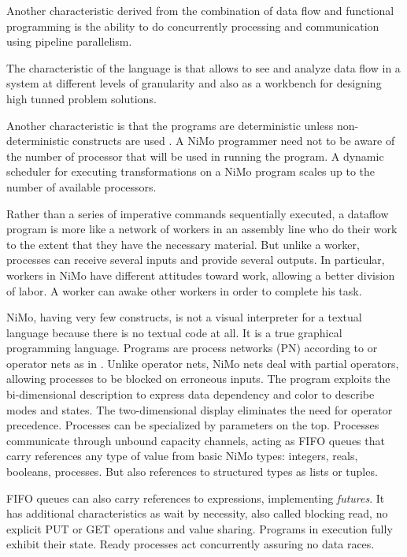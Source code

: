 \documentclass{article}                     \usepackage{graphics}
\begin{document}
Another characteristic derived from the combination of data flow and functional programming is the ability to do concurrently processing and communication using pipeline parallelism.

The characteristic of the language is that allows to see and analyze data flow in a system at different levels of granularity and also as a workbench for designing high tunned problem solutions.


Another characteristic is that the programs are deterministic unless non-deterministic constructs are used \cite{Lee:EECS-2006-1,Bocchino:2009}.  A NiMo programmer need  not to be aware of the number of processor that will be used in running the program. A dynamic scheduler for executing transformations on a NiMo program  scales up to the number of available processors.

Rather than a series of imperative commands sequentially executed, a dataflow program is more like a network of workers in an assembly line who do their work to the extent that they have the necessary material. But unlike a worker, processes can receive several inputs  and provide several outputs.   In particular, workers in  NiMo have different attitudes toward work, allowing a better division of labor. A worker can awake other workers in order to complete his task. 


 NiMo, having very few constructs,  is not a visual interpreter for a textual language because there is no textual code at all. It is a true graphical programming language.  Programs are process networks  (PN) according to \cite{CH-book} 
or operator nets as in \cite{springerlink:10.1007/BFb0027039}. Unlike operator nets, NiMo nets deal with partial operators, allowing processes to be blocked on erroneous inputs. The program exploits the bi-dimensional description  to express data dependency and color to describe modes and states. The two-dimensional display eliminates the need for operator precedence. 
Processes can be specialized by parameters on the top. Processes communicate  through unbound capacity  channels, acting as FIFO queues that  carry references any type of value from basic NiMo types: integers, reals, booleans,  processes. But also references to structured types as lists or tuples.

FIFO queues can also carry references to  expressions, implementing \textit{futures}.   It has  additional characteristics as wait by necessity, also called blocking read, no explicit PUT or GET operations and value sharing.
Programs in execution fully exhibit their state. Ready processes act concurrently assuring no data races.  
  
\end{document}
